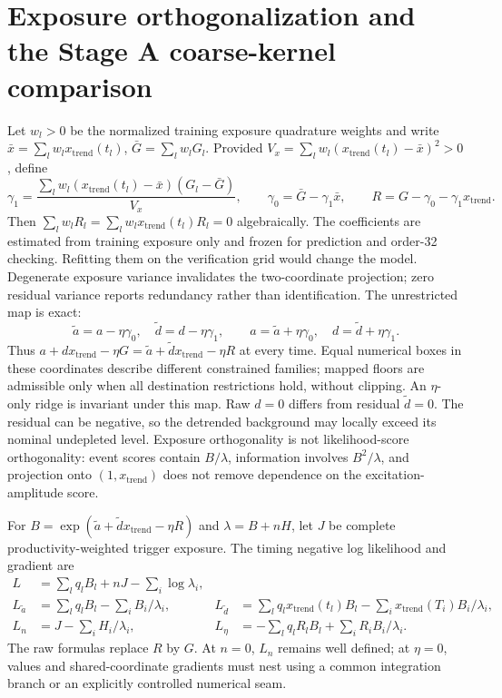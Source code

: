 \section{Exposure orthogonalization and the Stage A coarse-kernel comparison}
\label{sec:stage-a}
Let $w_l>0$ be the normalized training exposure quadrature weights and write
$\bar x=\sum_lw_lx_{\mathrm{trend}}(t_l)$, $\bar G=\sum_lw_lG_l$. Provided
$V_x=\sum_lw_l(x_{\mathrm{trend}}(t_l)-\bar x)^2>0$, define
\[
 \gamma_1=\frac{\sum_lw_l(x_{\mathrm{trend}}(t_l)-\bar x)(G_l-\bar G)}{V_x},\qquad
 \gamma_0=\bar G-\gamma_1\bar x,\qquad R=G-\gamma_0-\gamma_1x_{\mathrm{trend}}.
\]
Then $\sum_lw_lR_l=\sum_lw_lx_{\mathrm{trend}}(t_l)R_l=0$ algebraically. The coefficients
are estimated from training exposure only and frozen for prediction and
order-32 checking. Refitting them on the verification grid would change the
model. Degenerate exposure variance invalidates the two-coordinate projection;
zero residual variance reports redundancy rather than identification.
The unrestricted map is exact:
\[
 \widetilde a=a-\eta\gamma_0,\quad
 \widetilde d=d-\eta\gamma_1,\qquad
 a=\widetilde a+\eta\gamma_0,\quad
 d=\widetilde d+\eta\gamma_1.
\]
Thus $a+dx_{\mathrm{trend}}-\eta G=\widetilde a+\widetilde d x_{\mathrm{trend}}-\eta R$ at every time.
Equal numerical boxes in these coordinates describe different constrained
families; mapped floors are admissible only when all destination restrictions
hold, without clipping. An $\eta$-only ridge is invariant under this map.
Raw $d=0$ differs from residual $\widetilde d=0$. The residual can be negative,
so the detrended background may locally exceed its nominal undepleted level.
Exposure orthogonality is not likelihood-score orthogonality: event scores
contain $B/\lambda$, information involves $B^2/\lambda$, and projection onto
$(1,x_{\mathrm{trend}})$ does not remove dependence on the excitation-amplitude score.

For $B=\exp(\widetilde a+\widetilde d x_{\mathrm{trend}}-\eta R)$ and
$\lambda=B+nH$, let $J$ be complete productivity-weighted trigger exposure.
The timing negative log likelihood and gradient are
\begin{align*}
 L&=\sum_lq_lB_l+nJ-\sum_i\log\lambda_i,\\
 L_{\widetilde a}&=\sum_lq_lB_l-\sum_i B_i/\lambda_i,&
 L_{\widetilde d}&=\sum_lq_lx_{\mathrm{trend}}(t_l)B_l-\sum_i x_{\mathrm{trend}}(T_i)B_i/\lambda_i,\\
 L_n&=J-\sum_iH_i/\lambda_i,&
 L_\eta&=-\sum_lq_lR_lB_l+\sum_iR_iB_i/\lambda_i.
\end{align*}
The raw formulas replace $R$ by $G$. At $n=0$, $L_n$ remains well defined;
at $\eta=0$, values and shared-coordinate gradients must nest using a common
integration branch or an explicitly controlled numerical seam.

